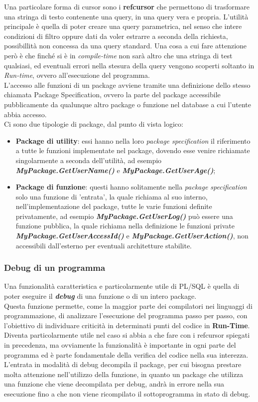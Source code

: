 Una particolare forma di cursor sono i \textbf{refcursor} che permettono di trasformare una stringa di testo contenente una query, in una query vera e propria. L'utilità principale è quella di poter creare una query parametrica, nel senso che intere condizioni di filtro oppure dati da voler estrarre a seconda della richiesta, possibillità non concessa da una query standard. Una cosa a cui fare attenzione però è che finché si è in \textit{compile-time} non sarà altro che una stringa di test qualsiasi, ed eventuali errori nella stesura della query vengono scoperti soltanto in \textit{Run-time}, ovvero all'esecuzione del programma.\\
L'accesso alle funzioni di un package avviene tramite una definizione dello stesso chiamata Package Specification, ovvero la parte del package accessibile pubblicamente da qualunque altro package o funzione nel database a cui l'utente abbia accesso.\\
Ci sono due tipologie di package, dal punto di vista logico:
\begin{itemize}
\item \textbf{Package di utility}: essi hanno nella loro \textit{package specification} il riferimento a tutte le funzioni implementate nel package, dovendo esse venire richiamate singolarmente a seconda dell'utilità, ad esempio \textbf{\textit{MyPackage.GetUserName()}} e \textbf{\textit{MyPackage.GetUserAge()}};
\item \textbf{Package di funzione}: questi hanno solitamente nella \textit{package specification} solo una funzione di 'entrata', la quale richiama al suo interno, nell'implementazione del package, tutte le varie funzioni definite privatamente, ad esempio \textbf{\textit{MyPackage.GetUserLog()}} può essere una funzione pubblica, la quale richiama nella definizione le funzioni private \textbf{\textit{MyPackage.GetUserAccessId()}} e \textbf{\textit{MyPackage.GetUserAction()}}, non accessibili dall'esterno per eventuali architetture stabilite.
\end{itemize}
\subsubsection{Debug di un programma}
Una funzionalità caratteristica e particolarmente utile di PL/SQL è quella di poter eseguire il \textbf{\textit{debug}} di una funzione o di un intero package.\\
Questa funzione permette, come la maggior parte dei compilatori nei linguaggi di programmazione, di analizzare l'esecuzione del programma passo per passo, con l'obiettivo di individuare criticità in determinati punti del codice in \textbf{Run-Time}. Diventa particolarmente utile nel caso si abbia a che fare con i refcursor spiegati in precedenza, ma ovviamente la funzionalità è importante in ogni parte del programma ed è parte fondamentale della verifica del codice nella sua interezza.\\
L'entrata in modalità di debug decompila il package, per cui bisogna prestare molta attenzione nell'utilizzo della funzione, in quanto un package che utilizza una funzione che viene decompilata per debug, andrà in errore nella sua esecuzione fino a che non viene ricompilato il sottoprogramma in stato di debug.
